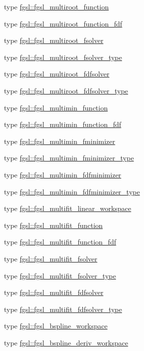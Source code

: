 \begin{DoxyCompactItemize}
type \hyperlink{structfgsl_1_1fgsl__multiroot__function}{fgsl\-::fgsl\-\_\-multiroot\-\_\-function}
\item 
type \hyperlink{structfgsl_1_1fgsl__multiroot__function__fdf}{fgsl\-::fgsl\-\_\-multiroot\-\_\-function\-\_\-fdf}
\item 
type \hyperlink{structfgsl_1_1fgsl__multiroot__fsolver}{fgsl\-::fgsl\-\_\-multiroot\-\_\-fsolver}
\item 
type \hyperlink{structfgsl_1_1fgsl__multiroot__fsolver__type}{fgsl\-::fgsl\-\_\-multiroot\-\_\-fsolver\-\_\-type}
\item 
type \hyperlink{structfgsl_1_1fgsl__multiroot__fdfsolver}{fgsl\-::fgsl\-\_\-multiroot\-\_\-fdfsolver}
\item 
type \hyperlink{structfgsl_1_1fgsl__multiroot__fdfsolver__type}{fgsl\-::fgsl\-\_\-multiroot\-\_\-fdfsolver\-\_\-type}
\item 
type \hyperlink{structfgsl_1_1fgsl__multimin__function}{fgsl\-::fgsl\-\_\-multimin\-\_\-function}
\item 
type \hyperlink{structfgsl_1_1fgsl__multimin__function__fdf}{fgsl\-::fgsl\-\_\-multimin\-\_\-function\-\_\-fdf}
\item 
type \hyperlink{structfgsl_1_1fgsl__multimin__fminimizer}{fgsl\-::fgsl\-\_\-multimin\-\_\-fminimizer}
\item 
type \hyperlink{structfgsl_1_1fgsl__multimin__fminimizer__type}{fgsl\-::fgsl\-\_\-multimin\-\_\-fminimizer\-\_\-type}
\item 
type \hyperlink{structfgsl_1_1fgsl__multimin__fdfminimizer}{fgsl\-::fgsl\-\_\-multimin\-\_\-fdfminimizer}
\item 
type \hyperlink{structfgsl_1_1fgsl__multimin__fdfminimizer__type}{fgsl\-::fgsl\-\_\-multimin\-\_\-fdfminimizer\-\_\-type}
\item 
type \hyperlink{structfgsl_1_1fgsl__multifit__linear__workspace}{fgsl\-::fgsl\-\_\-multifit\-\_\-linear\-\_\-workspace}
\item 
type \hyperlink{structfgsl_1_1fgsl__multifit__function}{fgsl\-::fgsl\-\_\-multifit\-\_\-function}
\item 
type \hyperlink{structfgsl_1_1fgsl__multifit__function__fdf}{fgsl\-::fgsl\-\_\-multifit\-\_\-function\-\_\-fdf}
\item 
type \hyperlink{structfgsl_1_1fgsl__multifit__fsolver}{fgsl\-::fgsl\-\_\-multifit\-\_\-fsolver}
\item 
type \hyperlink{structfgsl_1_1fgsl__multifit__fsolver__type}{fgsl\-::fgsl\-\_\-multifit\-\_\-fsolver\-\_\-type}
\item 
type \hyperlink{structfgsl_1_1fgsl__multifit__fdfsolver}{fgsl\-::fgsl\-\_\-multifit\-\_\-fdfsolver}
\item 
type \hyperlink{structfgsl_1_1fgsl__multifit__fdfsolver__type}{fgsl\-::fgsl\-\_\-multifit\-\_\-fdfsolver\-\_\-type}
\item 
type \hyperlink{structfgsl_1_1fgsl__bspline__workspace}{fgsl\-::fgsl\-\_\-bspline\-\_\-workspace}
\item 
type \hyperlink{structfgsl_1_1fgsl__bspline__deriv__workspace}{fgsl\-::fgsl\-\_\-bspline\-\_\-deriv\-\_\-workspace}
\end{DoxyCompactItemize}
